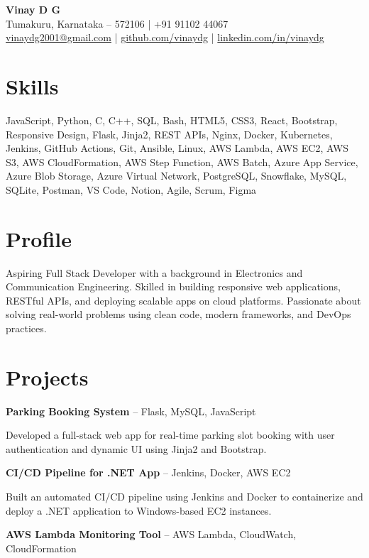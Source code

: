 \documentclass[a4paper,10pt]{article}
\begin{document}
\begin{center}
    \textbf{\Large Vinay D G} \\
    Tumakuru, Karnataka – 572106 \quad | \quad +91 91102 44067 \\
    \href{mailto:vinaydg2001@gmail.com}{vinaydg2001@gmail.com} \quad | \quad
    \href{https://github.com/vinaydg}{github.com/vinaydg} \quad | \quad
    \href{https://linkedin.com/in/vinaydg}{linkedin.com/in/vinaydg}
\end{center}

\section*{Skills}
JavaScript, Python, C, C++, SQL, Bash, HTML5, CSS3, React, Bootstrap, Responsive Design, Flask, Jinja2, REST APIs, Nginx, Docker, Kubernetes, Jenkins, GitHub Actions, Git, Ansible, Linux, AWS Lambda, AWS EC2, AWS S3, AWS CloudFormation, AWS Step Function, AWS Batch, Azure App Service, Azure Blob Storage, Azure Virtual Network, PostgreSQL, Snowflake, MySQL, SQLite, Postman, VS Code, Notion, Agile, Scrum, Figma

\section*{Profile}
Aspiring Full Stack Developer with a background in Electronics and Communication Engineering. Skilled in building responsive web applications, RESTful APIs, and deploying scalable apps on cloud platforms. Passionate about solving real-world problems using clean code, modern frameworks, and DevOps practices.

\section*{Projects}
\textbf{Parking Booking System} – Flask, MySQL, JavaScript

Developed a full-stack web app for real-time parking slot booking with user authentication and dynamic UI using Jinja2 and Bootstrap.

\textbf{CI/CD Pipeline for .NET App} – Jenkins, Docker, AWS EC2

Built an automated CI/CD pipeline using Jenkins and Docker to containerize and deploy a .NET application to Windows-based EC2 instances.

\textbf{AWS Lambda Monitoring Tool} – AWS Lambda, CloudWatch, CloudFormation
\end{document}
